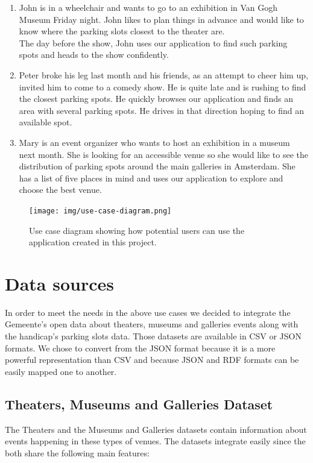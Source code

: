 \documentclass[runningheads,a4paper]{../../StyleFiles/llncs}
\begin{document}
\begin{enumerate}
	\item John is in a wheelchair and wants to go to an exhibition in Van Gogh Museum Friday night. John likes to plan things in advance and would like to know where the parking slots closest to the theater are. \\
	The day before the show, John uses our application to find such parking spots and heads to the show confidently. 
	\item Peter broke his leg last month and his friends, as an attempt to cheer him up, invited him to come to a comedy show. He is quite late and is rushing to find the closest parking spots. He quickly browses our application and finds an area with several parking spots. He drives in that direction hoping to find an available spot. 
	\item Mary is an event organizer who wants to host an exhibition in a museum next month. She is looking for an accessible venue so she would like to see the distribution of parking spots around the main galleries in Amsterdam. She has a list of five places in mind and uses our application to explore and choose the best venue.
\end{enumerate}

\begin{figure}[ht]
	\centering
	\texttt{[image: img/use-case-diagram.png]}
	\caption{Use case diagram showing how potential users can use the application created in this project.}
	\label{fig:use-case}
\end{figure}

\section{Data sources}
In order to meet the needs in the above use cases we decided to integrate the Gemeente's open data about theaters, museums and galleries events along with the handicap's parking slots data. Those datasets are available in CSV or JSON formats. We chose to convert from the JSON format because it is a more powerful representation than CSV and because JSON and RDF formats can be easily mapped one to another.

\subsection{Theaters, Museums and Galleries Dataset}
The Theaters and the Museums and Galleries datasets contain information about events happening in these types of venues. The datasets integrate easily since the both share the following main features:
\end{document}
